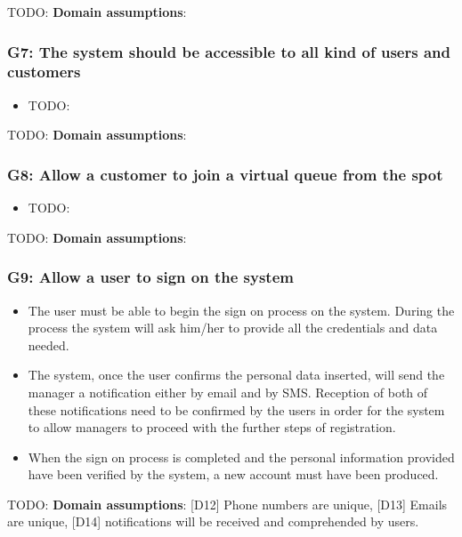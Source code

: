 TODO: \textbf{Domain assumptions}:

\subsubsection{G7: The system should be accessible to all kind of users and customers}
\label{subsubsect:G7}

\begin{itemize}[topsep=0pt]
    \item TODO:
\end{itemize}

TODO: \textbf{Domain assumptions}:

\subsubsection{G8: Allow a customer to join a virtual queue from the spot}
\label{subsubsect:G8}

\begin{itemize}[topsep=0pt]
    \item TODO:
\end{itemize}

TODO: \textbf{Domain assumptions}: 

\subsubsection{G9: Allow a user to sign on the system}
\label{subsubsect:G9}

\begin{itemize}[topsep=0pt]
    \item The user must be able to begin the sign on process on the system. During the process the system will ask him/her to provide all the credentials and data needed.
    \item The system, once the user confirms the personal data inserted, will send the manager a notification either by email and by SMS. Reception of both of these notifications need to be confirmed by the users in order for the system to allow managers to proceed with the further steps of registration.
    \item When the sign on process is completed and the personal information provided have been verified by the system, a new account must have been produced.
\end{itemize}

TODO: \textbf{Domain assumptions}: [D12] Phone numbers are unique, [D13] Emails are unique, [D14] notifications will be received and comprehended by users.

